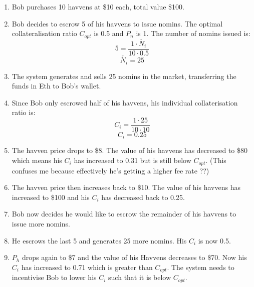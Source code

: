 \begin{enumerate}
\item{Bob purchases 10 havvens at \$10 each, total value \$100.}
\item{Bob decides to escrow 5 of his havvens to issue nomins. The optimal collateralisation ratio $C_{opt}$ is 0.5 and $P_n$ is 1. The number of nomins issued is: }
$$ 5 = \frac{1 \cdot \check{N_i}}{10 \cdot 0.5} $$
$$ \check{N_i} = 25 $$
\item{The system generates and sells 25 nomins in the market, transferring the funds in Eth to Bob's wallet.}
\item{Since Bob only escrowed half of his havvens, his individual collaterisation ratio is:}
$$ C_i = \frac{1 \cdot 25}{10 \cdot 10}$$
$$ C_i = 0.25 $$
\item{The havven price drops to \$8. The value of his havvens has decreased to \$80 which means his $C_i$ has increased to 0.31 but is still below $C_{opt}$. (This confuses me because effectively he's getting a higher fee rate ??)}
\item{The havven price then increases back to \$10. The value of his havvens has increased to \$100 and his $C_i$ has decreased back to 0.25.}
\item{Bob now decides he would like to escrow the remainder of his havvens to issue more nomins.}
\item{He escrows the last 5 and generates 25 more nomins. His $C_i$ is now 0.5.}
\item{$P_h$ drops again to \$7 and the value of his Havvens decreases to \$70. Now his $C_i$ has increased to 0.71 which is greater than $C_{opt}$. The system needs to incentivise Bob to lower his $C_i$ such that it is below $C_{opt}$.}
\end{enumerate}




